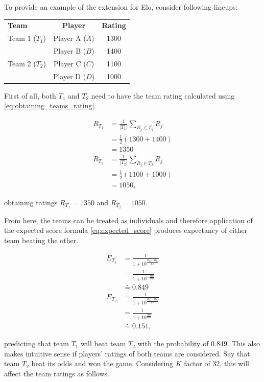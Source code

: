\examplespace
\begin{example}
To provide an example of the extension for Elo, consider following lineups:

\begin{table}[H]
\centering
\begin{tabular}{l c c}
\textbf{Team} & \textbf{Player} & \textbf{Rating} \\
Team 1 ($T_1$) & Player A ($A$) & 1300 \\
& Player B ($B$) & 1400 \\
Team 2 ($T_2$) & Player C ($C$) & 1100 \\
& Player D ($D$) & 1000 \\
\end{tabular}
\end{table}

First of all, both $T_1$ and $T_2$ need to have the team rating calculated using \eqref{eq:obtaining_teams_rating}.

\begin{align*}
R_{T_1} &= \frac{1}{|T_1|}\sum_{R_j \in T_1}{R_j} \\
&= \frac{1}{2}(1300 + 1400) \\
&= 1350 \\[1.5em]
R_{T_2} &= \frac{1}{|T_2|}\sum_{R_j \in T_2}{R_j} \\
&= \frac{1}{2}(1100 + 1000) \\ 
&= 1050,
\end{align*}

\noindent obtaining ratings $R_{T_1} = 1350$ and $R_{T_2} = 1050$.

From here, the teams can be treated as individuals and therefore application of the expected score formula \eqref{eq:expected_score} produces expectancy of either team beating the other.

\begin{align*}
E_{T_1} &= \frac{1}{1+10^{\frac{R_{T_2} - R_{T_1}}{400}}} \\
&= \frac{1}{1+10^{-\frac{300}{400}}} \\
&\doteq 0.849 \\[1.5em]
E_{T_2} &= \frac{1}{1+10^{\frac{R_{T_1} - R_{T_2}}{400}}} \\
&= \frac{1}{1+10^{\frac{300}{400}}} \\
&\doteq 0.151,
\end{align*}

\noindent predicting that team $T_1$ will beat team $T_2$ with the probability of 0.849. This also makes intuitive sense if players' ratings of both teams are considered.
Say that team $T_2$ beat its odds and won the game. Considering $K$ factor of 32, this will affect the team ratings as follows.


\end{example}
